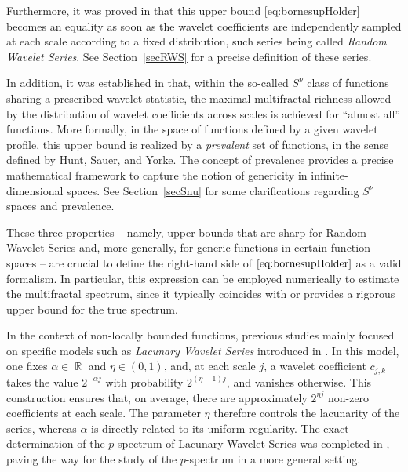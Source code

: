 \documentclass[a4paper,11pt,oneside]{article}
\DeclareMathOperator{\R}{\mathbb{R}}
\theoremstyle{definition}
\theoremstyle{plain}
\begin{document}
Furthermore, it was proved in \cite{RWS} that this upper bound \eqref{eq:bornesupHolder} becomes an equality as soon as the wavelet coefficients are independently sampled at each scale according to a fixed distribution, such series being called \textit{Random Wavelet Series}. See Section~\ref{secRWS} for a precise definition of these series.

In addition, it was established in \cite{aubryPrevalence} that, within the so-called $S^{\nu}$ class of functions sharing a prescribed wavelet statistic, the maximal multifractal richness allowed by the distribution of wavelet coefficients across scales is achieved for ``almost all'' functions. More formally, in the space of functions defined by a given wavelet profile, this upper bound is realized by a \emph{prevalent} set of functions, in the sense defined by Hunt, Sauer, and Yorke. The concept of prevalence provides a precise mathematical framework to capture the notion of genericity in infinite-dimensional spaces. See Section~\ref{secSnu} for some clarifications regarding $S^\nu$ spaces and prevalence.

These three properties -- namely, upper bounds that are sharp for Random Wavelet Series and, more generally, for generic functions in certain function spaces -- are crucial to define the right-hand side of $\eqref{eq:bornesupHolder}$ as a valid formalism. In particular, this expression can be employed numerically to estimate the multifractal spectrum, since it typically coincides with or provides a rigorous upper bound for the true  spectrum.

\medskip

In the context of non-locally bounded functions, previous studies mainly focused on specific models such as \emph{Lacunary Wavelet Series} introduced in \cite{LWS}.  In this model, one fixes $\alpha\in\R$ and $\eta\in(0,1)$, and, at each scale $j$, a wavelet coefficient $c_{j,k}$ takes the value $2^{-\alpha j}$ with probability $2^{(\eta-1)j}$, and vanishes otherwise.
 This construction ensures that, on average, there are approximately $2^{\eta j}$ non-zero coefficients at each scale. The parameter $\eta$ therefore controls the lacunarity of the series, whereas $\alpha$ is directly related to its uniform regularity. The exact determination of the $p$-spectrum of Lacunary Wavelet Series was completed in \cite{pLWS}, paving the way for the study of the $p$-spectrum in a more general setting.
\end{document}
